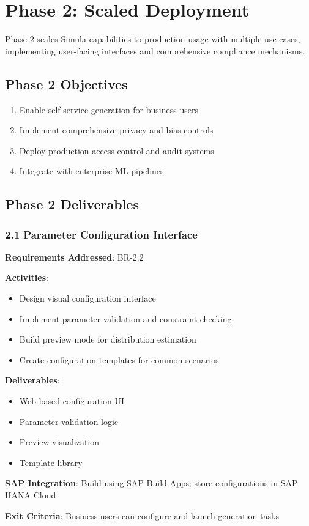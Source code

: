 \documentclass[12pt,a4paper,twoside]{report}
\begin{document}
\section{Phase 2: Scaled Deployment}

Phase 2 scales Simula capabilities to production usage with multiple use cases,
implementing user-facing interfaces and comprehensive compliance mechanisms.

\subsection{Phase 2 Objectives}

\begin{enumerate}
\item Enable self-service generation for business users
\item Implement comprehensive privacy and bias controls
\item Deploy production access control and audit systems
\item Integrate with enterprise ML pipelines
\end{enumerate}

\subsection{Phase 2 Deliverables}

\subsubsection{2.1 Parameter Configuration Interface}

\begin{tcolorbox}[colback=green!5,colframe=green!70,title=2.1 User Configuration Interface]
\textbf{Requirements Addressed}: BR-2.2

\textbf{Activities}:
\begin{itemize}
\item Design visual configuration interface
\item Implement parameter validation and constraint checking
\item Build preview mode for distribution estimation
\item Create configuration templates for common scenarios
\end{itemize}

\textbf{Deliverables}:
\begin{itemize}
\item Web-based configuration UI
\item Parameter validation logic
\item Preview visualization
\item Template library
\end{itemize}

\textbf{SAP Integration}: Build using SAP Build Apps; store configurations in
SAP HANA Cloud

\textbf{Exit Criteria}: Business users can configure and launch generation tasks
\end{tcolorbox}
\end{document}

